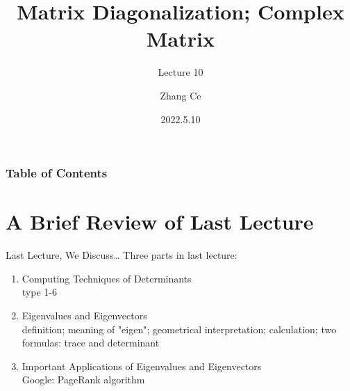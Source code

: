 \documentclass{beamer}
\title[Linear Algebra] %
{Matrix Diagonalization; Complex Matrix}
\subtitle{Lecture 10}
\author[11910803@mail.sustech.edu.cn] %
{
    Zhang Ce
}
\institute[] %
{
    Department of Electrical and Electronic Engineering\\
    Southern University of Science and Technology
}
\date[2022.5.10] %
{2022.5.10}
\begin{document}
\frame{\titlepage}


\begin{frame}
\frametitle{Table of Contents}
\tableofcontents
\end{frame}
\section{A Brief Review of Last Lecture}
\begin{frame}{Last Lecture, We Discuss\dots}
Three parts in last lecture:
    \begin{enumerate}
        \item Computing Techniques of Determinants\\
        type 1-6
        \item Eigenvalues and Eigenvectors\\
        definition; meaning of "eigen"; geometrical interpretation; calculation; two formulas: trace and determinant
        \item Important Applications of Eigenvalues and Eigenvectors\\
        Google: PageRank algorithm
    \end{enumerate}

\end{frame}
\end{document}
